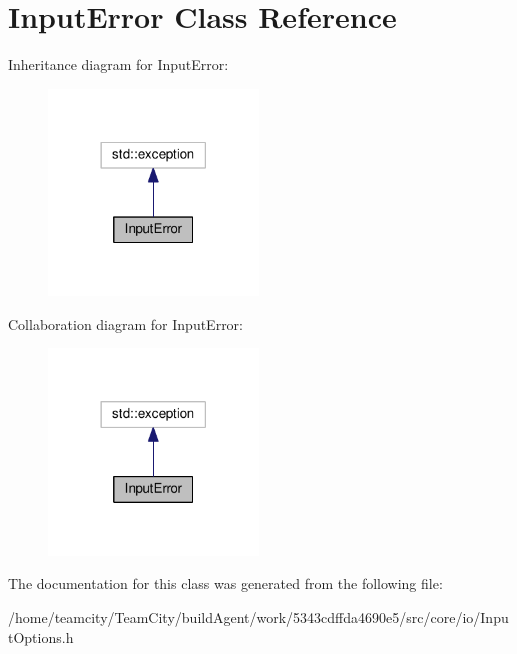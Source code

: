 \hypertarget{classInputError}{}\section{Input\+Error Class Reference}
\label{classInputError}


Inheritance diagram for Input\+Error\+:
\nopagebreak
\begin{figure}[H]
\begin{center}
\leavevmode
\includegraphics[width=158pt]{classInputError__inherit__graph}
\end{center}
\end{figure}


Collaboration diagram for Input\+Error\+:
\nopagebreak
\begin{figure}[H]
\begin{center}
\leavevmode
\includegraphics[width=158pt]{classInputError__coll__graph}
\end{center}
\end{figure}


The documentation for this class was generated from the following file\+:\begin{DoxyCompactItemize}
\item 
/home/teamcity/\+Team\+City/build\+Agent/work/5343cdffda4690e5/src/core/io/Input\+Options.\+h\end{DoxyCompactItemize}
